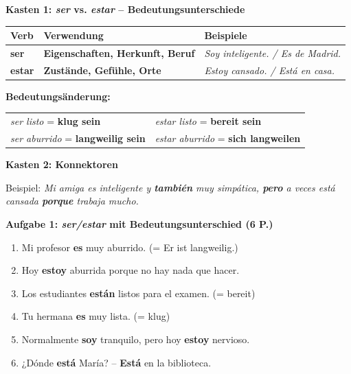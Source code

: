 \documentclass[11pt,a4paper]{article}
\newcommand{\lsg}[1]{\textcolor{loesung}{\textbf{#1}}}
\newcommand{\es}[1]{\textit{#1}}
\begin{document}
\begin{gruppeBbox}

\textbf{Kasten 1: \es{ser} vs. \es{estar} -- Bedeutungsunterschiede}

\begin{tabularx}{\textwidth}{@{}|p{2.5cm}|X|X|@{}}
\hline
\textbf{Verb} & \textbf{Verwendung} & \textbf{Beispiele} \\
\hline
\textbf{ser} & \lsg{Eigenschaften, Herkunft, Beruf} & \es{Soy inteligente. / Es de Madrid.} \\
\hline
\textbf{estar} & \lsg{Zustände, Gefühle, Orte} & \es{Estoy cansado. / Está en casa.} \\
\hline
\end{tabularx}

\vspace{0.3em}
\textbf{Bedeutungsänderung:}
\begin{tabular}{ll}
\es{ser listo} = \lsg{klug sein} & \es{estar listo} = \lsg{bereit sein} \\
\es{ser aburrido} = \lsg{langweilig sein} & \es{estar aburrido} = \lsg{sich langweilen} \\
\end{tabular}

\vspace{0.5em}

\textbf{Kasten 2: Konnektoren}

Beispiel: \es{Mi amiga es inteligente y \lsg{también} muy simpática, \lsg{pero} a veces está cansada \lsg{porque} trabaja mucho.}

\vspace{0.8em}

\textbf{Aufgabe 1: \es{ser/estar} mit Bedeutungsunterschied (6 P.)}
\begin{enumerate}[label=\alph*), leftmargin=2em, nosep]
    \item Mi profesor \lsg{es} muy aburrido. (= Er ist langweilig.)
    \item Hoy \lsg{estoy} aburrida porque no hay nada que hacer.
    \item Los estudiantes \lsg{están} listos para el examen. (= bereit)
    \item Tu hermana \lsg{es} muy lista. (= klug)
    \item Normalmente \lsg{soy} tranquilo, pero hoy \lsg{estoy} nervioso.
    \item ¿Dónde \lsg{está} María? -- \lsg{Está} en la biblioteca.
\end{enumerate}


\end{gruppeBbox}
\end{document}
